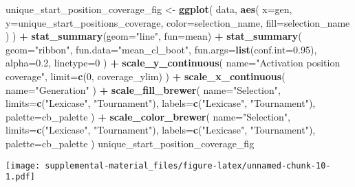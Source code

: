 \documentclass[]{book}
\newenvironment{Shaded}{\begin{snugshade}}{\end{snugshade}}
\newcommand{\DataTypeTok}[1]{\textcolor[rgb]{0.13,0.29,0.53}{#1}}
\newcommand{\DecValTok}[1]{\textcolor[rgb]{0.00,0.00,0.81}{#1}}
\newcommand{\FloatTok}[1]{\textcolor[rgb]{0.00,0.00,0.81}{#1}}
\newcommand{\KeywordTok}[1]{\textcolor[rgb]{0.13,0.29,0.53}{\textbf{#1}}}
\newcommand{\NormalTok}[1]{#1}
\newcommand{\OperatorTok}[1]{\textcolor[rgb]{0.81,0.36,0.00}{\textbf{#1}}}
\newcommand{\StringTok}[1]{\textcolor[rgb]{0.31,0.60,0.02}{#1}}
\begin{document}
\begin{Shaded}
\begin{Highlighting}[]
\NormalTok{unique_start_position_coverage_fig <-}\StringTok{ }\KeywordTok{ggplot}\NormalTok{(}
\NormalTok{    data,}
    \KeywordTok{aes}\NormalTok{(}
      \DataTypeTok{x=}\NormalTok{gen,}
      \DataTypeTok{y=}\NormalTok{unique_start_positions_coverage,}
      \DataTypeTok{color=}\NormalTok{selection_name,}
      \DataTypeTok{fill=}\NormalTok{selection_name}
\NormalTok{    )}
\NormalTok{  ) }\OperatorTok{+}
\StringTok{  }\KeywordTok{stat_summary}\NormalTok{(}\DataTypeTok{geom=}\StringTok{"line"}\NormalTok{, }\DataTypeTok{fun=}\NormalTok{mean) }\OperatorTok{+}
\StringTok{  }\KeywordTok{stat_summary}\NormalTok{(}
    \DataTypeTok{geom=}\StringTok{"ribbon"}\NormalTok{,}
    \DataTypeTok{fun.data=}\StringTok{"mean_cl_boot"}\NormalTok{,}
    \DataTypeTok{fun.args=}\KeywordTok{list}\NormalTok{(}\DataTypeTok{conf.int=}\FloatTok{0.95}\NormalTok{),}
    \DataTypeTok{alpha=}\FloatTok{0.2}\NormalTok{,}
    \DataTypeTok{linetype=}\DecValTok{0}
\NormalTok{  ) }\OperatorTok{+}
\StringTok{  }\KeywordTok{scale_y_continuous}\NormalTok{(}
    \DataTypeTok{name=}\StringTok{"Activation position coverage"}\NormalTok{,}
    \DataTypeTok{limit=}\KeywordTok{c}\NormalTok{(}\DecValTok{0}\NormalTok{, coverage_ylim)}
\NormalTok{  ) }\OperatorTok{+}
\StringTok{  }\KeywordTok{scale_x_continuous}\NormalTok{(}
    \DataTypeTok{name=}\StringTok{"Generation"}
\NormalTok{  ) }\OperatorTok{+}
\StringTok{  }\KeywordTok{scale_fill_brewer}\NormalTok{(}
    \DataTypeTok{name=}\StringTok{"Selection"}\NormalTok{,}
    \DataTypeTok{limits=}\KeywordTok{c}\NormalTok{(}\StringTok{"Lexicase"}\NormalTok{, }\StringTok{"Tournament"}\NormalTok{),}
    \DataTypeTok{labels=}\KeywordTok{c}\NormalTok{(}\StringTok{"Lexicase"}\NormalTok{, }\StringTok{"Tournament"}\NormalTok{),}
    \DataTypeTok{palette=}\NormalTok{cb_palette}
\NormalTok{  ) }\OperatorTok{+}
\StringTok{  }\KeywordTok{scale_color_brewer}\NormalTok{(}
    \DataTypeTok{name=}\StringTok{"Selection"}\NormalTok{,}
    \DataTypeTok{limits=}\KeywordTok{c}\NormalTok{(}\StringTok{"Lexicase"}\NormalTok{, }\StringTok{"Tournament"}\NormalTok{),}
    \DataTypeTok{labels=}\KeywordTok{c}\NormalTok{(}\StringTok{"Lexicase"}\NormalTok{, }\StringTok{"Tournament"}\NormalTok{),}
    \DataTypeTok{palette=}\NormalTok{cb_palette}
\NormalTok{  )}
\NormalTok{unique_start_position_coverage_fig}
\end{Highlighting}
\end{Shaded}

\texttt{[image: supplemental-material\_files/figure-latex/unnamed-chunk-10-1.pdf]}
\end{document}
